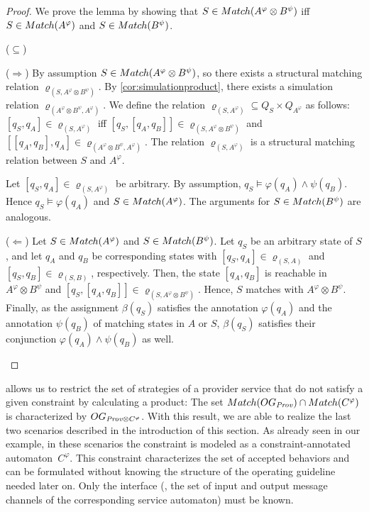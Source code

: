 \begin{proof} We prove the lemma by showing that $S\in\mathop{Match}(A^{\varphi}\otimes B^{\psi})$ iff $S\in\mathop{Match}(A^{\varphi})$ and $S\in\mathop{Match}(B^{\psi})$.

\begin{labeling}{($\subseteq$)}
\item[($\Rightarrow$)]
By assumption $S\in\mathop{Match}(A^{\varphi}\otimes B^{\psi})$, so there exists a structural matching relation $\varrho_{(S,A^{\varphi}\otimes B^{\psi})}$. By \autoref{cor:simulationproduct}, there exists a simulation relation $\varrho_{(A^{\varphi}\otimes B^{\psi},A^{\varphi})}$. We define the relation $\varrho_{(S,A^{\varphi})}\subseteq Q_{S}\times Q_{A^{\varphi}}$ as follows: $[q_{S},q_{A}]\in\varrho_{(S,A^{\varphi})}$ iff $[q_{S},[q_{A},q_{B}]]\in\varrho_{(S,A^{\varphi}\otimes B^{\psi})}$ and $[[q_{A},q_{B}],q_{A}]\in\varrho_{(A^{\varphi}\otimes B^{\psi},A^{\varphi})}$. The relation $\varrho_{(S,A^{\varphi})}$ is a structural matching relation between $S$ and $A^{\varphi}$.

Let $[q_{S},q_{A}]\in\varrho_{(S,A^{\varphi})}$ be arbitrary. By assumption, $q_{S}\models \varphi(q_{A})\wedge \psi(q_{B})$. Hence $q_{S}\models \varphi(q_{A})$ and $S\in\mathop{Match}(A^{\varphi})$. The arguments for $S\in\mathop{Match}(B^{\psi})$ are analogous.

\item[($\Leftarrow $)] Let $S\in\mathop{Match}(A^{\varphi})$ and $S\in\mathop{Match}(B^{\psi})$. Let $q_{S}$ be an arbitrary state of $S$, and let $q_A$ and $q_B$ be corresponding states with $[q_{S},q_{A}]\in \varrho_{({S}, A)}$ and $[q_{S},q_{B}]\in\varrho_{({S}, B)}$, respectively. Then, the state $[q_A, q_B]$ is reachable in $A^\varphi \otimes B^\psi$ and $[q_{S}, [q_A, q_B]] \in \varrho_{(S, A^\varphi \otimes B^\psi)}$. Hence, $S$ matches with $A^\varphi \otimes B^\psi$. Finally, as the assignment $\beta(q_{S})$ satisfies the annotation $\varphi(q_A)$ and the annotation $\psi(q_B)$ of matching states in $A$ or $S$, $\beta(q_{S})$ satisfies their conjunction $\varphi(q_A)\wedge \psi(q_B)$ as well.
\end{labeling}\vspace{-1em}
\end{proof}

 allows us to restrict the set of strategies of a provider service that do not satisfy a given constraint by calculating a product: The set $\mathop{Match}(\mathop{OG}_{\mathit{Prov}})\cap \mathop{Match}(C^{\varphi})$ is characterized by $\mathop{OG}_{\mathit{Prov}\otimes C^{\varphi}}$. With this result, we are able to realize the last two scenarios described in the introduction of this section. As already seen in our example, in these scenarios the constraint is modeled as a constraint-annotated automaton~$C^\varphi$. This constraint characterizes the set of accepted behaviors and can be formulated without knowing the structure of the operating guideline needed later on. Only the interface (\ie, the set of input and output message channels of the corresponding service automaton) must be known.




